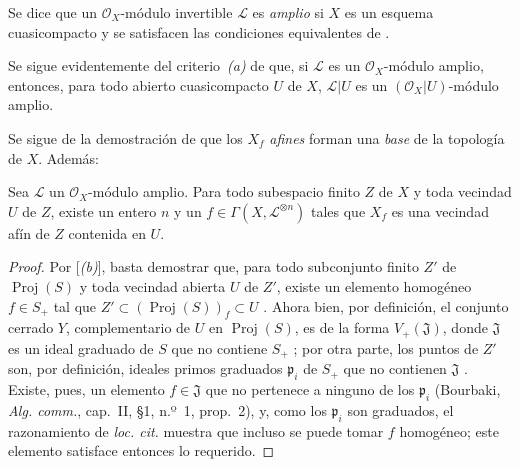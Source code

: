 \documentclass[oneside,10pt]{amsart}
\newcommand{\oldpage}[2][]{\marginnote{\normalfont\footnotesize\textbf{#1}~|~#2}\ignorespaces}
\let\EGAOriginalLabel\label
\renewcommand{\label}[1]{\phantomsection\EGAOriginalLabel{#1}}
\begin{document}
\begin{definition}[4.5.3]
\label{II.4.5.3-fr}
Se dice que un $\mathcal{O}_X$-módulo invertible $\mathcal{L}$ es \emph{amplio} si $X$ es un esquema cuasicompacto y se satisfacen las condiciones equivalentes de .
\end{definition}

Se sigue evidentemente del criterio~\emph{(a)} de  que, si $\mathcal{L}$ es un $\mathcal{O}_X$-módulo amplio, entonces, para todo abierto cuasicompacto $U$ de $X$, $\mathcal{L}|U$ es un $(\mathcal{O}_X|U)$-módulo amplio.

Se sigue de la demostración de  que los $X_f$ \emph{afines} forman una \emph{base} de la topología de $X$.
Además:

\begin{corollary}[4.5.4]
\label{II.4.5.4-fr}
Sea $\mathcal{L}$ un $\mathcal{O}_X$-módulo amplio.
Para todo subespacio finito $Z$ de $X$ y toda vecindad $U$ de $Z$, existe un entero $n$ y un $f\in\Gamma(X,\mathcal{L}^{\otimes n})$ tales que $X_f$ es una vecindad afín de $Z$ contenida en $U$.
\end{corollary}

\begin{proof}
\oldpage[II]{85}
Por [\emph{(b)}], basta demostrar que, para todo subconjunto finito $Z'$ de $\operatorname{Proj}(S)$ y toda vecindad abierta $U$ de $Z'$, existe un elemento homogéneo $f\in S_+$ tal que $Z'\subset(\operatorname{Proj}(S))_f\subset U$ .
Ahora bien, por definición, el conjunto cerrado $Y$, complementario de $U$ en $\operatorname{Proj}(S)$, es de la forma $V_+(\mathfrak{J})$, donde $\mathfrak{J}$ es un ideal graduado de $S$ que no contiene $S_+$ ;
por otra parte, los puntos de $Z'$ son, por definición, ideales primos graduados $\mathfrak{p}_i$ de $S_+$ que no contienen $\mathfrak{J}$ .
Existe, pues, un elemento $f\in\mathfrak{J}$ que no pertenece a ninguno de los $\mathfrak{p}_i$ (Bourbaki, \emph{Alg. comm.}, cap.~II, \S1, n.º~1, prop.~2), y, como los $\mathfrak{p}_i$ son graduados, el razonamiento de \emph{loc. cit.} muestra que incluso se puede tomar $f$ homogéneo;
este elemento satisface entonces lo requerido.
\end{proof}
\end{document}
